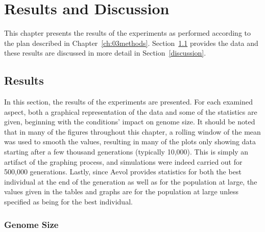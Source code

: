 \chapter{Results and Discussion}\label{ch:04results_discussion}

This chapter presents the results of the experiments as performed according to the plan described in Chapter~\ref{ch:03methods}. Section~\ref{results} provides the data and these results are discussed in more detail in Section~\ref{discussion}. 

\section{Results}\label{results}
In this section, the results of the experiments are presented. For each examined aspect, both a graphical representation of the data and some of the statistics are given, beginning with the conditions' impact on genome size. It should be noted that in many of the figures throughout this chapter, a rolling window of the mean was used to smooth the values, resulting in many of the plots only showing data starting after a few thousand generations (typically 10,000). This is simply an artifact of the graphing process, and simulations were indeed carried out for 500,000 generations. Lastly, since Aevol provides statistics for both the best individual at the end of the generation as well as for the population at large, the values given in the tables and graphs are for the population at large unless specified as being for the best individual. 

\subsection{Genome Size}\label{sec:genome_size}


